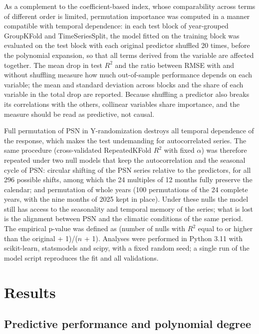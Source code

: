 \documentclass[a4paper,fleqn]{cas-dc}
\begin{document}
As a complement to the coefficient-based index, whose comparability across terms of different order is limited, permutation importance \citep{breiman2001} was computed in a manner compatible with temporal dependence: in each test block of year-grouped GroupKFold and TimeSeriesSplit, the model fitted on the training block was evaluated on the test block with each original predictor shuffled 20 times, before the polynomial expansion, so that all terms derived from the variable are affected together. The mean drop in test $R^2$ and the ratio between RMSE with and without shuffling measure how much out-of-sample performance depends on each variable; the mean and standard deviation across blocks and the share of each variable in the total drop are reported. Because shuffling a predictor also breaks its correlations with the others, collinear variables share importance, and the measure should be read as predictive, not causal.

Full permutation of PSN in Y-randomization destroys all temporal dependence of the response, which makes the test undemanding for autocorrelated series. The same procedure (cross-validated RepeatedKFold $R^2$ with fixed $\alpha$) was therefore repeated under two null models that keep the autocorrelation and the seasonal cycle of PSN: circular shifting of the PSN series relative to the predictors, for all 296 possible shifts, among which the 24 multiples of 12 months fully preserve the calendar; and permutation of whole years (100 permutations of the 24 complete years, with the nine months of 2025 kept in place). Under these nulls the model still has access to the seasonality and temporal memory of the series; what is lost is the alignment between PSN and the climatic conditions of the same period. The empirical p-value was defined as (number of nulls with $R^2$ equal to or higher than the original + 1)/($n$ + 1). Analyses were performed in Python 3.11 with scikit-learn, statsmodels and scipy, with a fixed random seed; a single run of the model script reproduces the fit and all validations.

\section{Results}\label{sec:results}

\subsection{Predictive performance and polynomial degree}
\end{document}
